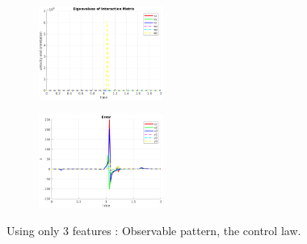 \documentclass[a4paper,12pt]{article}
\begin{document}
\begin{figure}[tb!]
\begin{subfigure}[b]{0.2\textwidth}
                \centering
                \includegraphics[height=1.2in]{../results/Demo2-3-eignen.png}
                 \end{subfigure}%
         \begin{subfigure}[b]{0.32\textwidth}
                \centering
                \includegraphics[height=1.2in]{../results/Demo2-3-error.png}
                 \end{subfigure}%
         \caption{Using only 3 features : Observable pattern, the control law.}
        \label{fig:demo2-3}
\end{figure}
\end{document}
